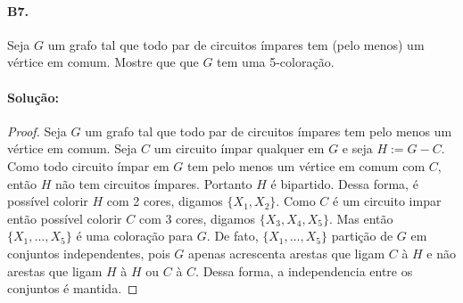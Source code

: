 \documentclass[11pt,a4paper,notitlepage]{exam}
\begin{document}
\paragraph{B7.} Seja $G$ um grafo tal que todo par de circuitos ímpares
tem (pelo menos) um vértice em comum. Mostre que que $G$ tem uma
5-coloração.

\paragraph{Solução:}
\begin{proof}
    Seja $G$ um grafo tal que todo par de circuitos ímpares tem pelo
    menos um vértice em comum. Seja $C$ um circuito ímpar qualquer
    em $G$ e seja $H:=G-C$. Como todo circuito ímpar em $G$ tem pelo
    menos um vértice em comum com $C$, então $H$ não tem circuitos ímpares.
    Portanto $H$ é bipartido. Dessa forma, é possível colorir $H$ com
    2 cores, digamos $\{X_1, X_2\}$. Como $C$ é um circuito impar então
    possível colorir $C$ com 3 cores, digamos $\{X_3, X_4, X_5\}$.
    Mas então $\{X_1, \dots, X_5\}$ é uma coloração para $G$. De fato,
    $\{X_1, \dots, X_5\}$ partição de $G$ em conjuntos
    independentes, pois $G$ apenas acrescenta arestas que ligam $C$ à
    $H$ e não arestas que ligam $H$ à $H$ ou $C$ à $C$. Dessa forma, a
    independencia entre os conjuntos é mantida.
\end{proof}
\end{document}
